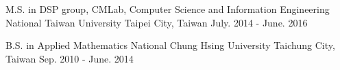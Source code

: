 

\begin{cventries}

  \cventry
    {M.S. in DSP group, CMLab, Computer Science and Information Engineering} %
    {National Taiwan University} %
    {Taipei City, Taiwan} %
    {July. 2014 - June. 2016} %
    {
      \begin{cvitems} %
      \end{cvitems}
    }

  \cventry
    {B.S. in Applied Mathematics} %
    {National Chung Hsing University} %
    {Taichung City, Taiwan} %
    {Sep. 2010 - June. 2014} %
    {
      \begin{cvitems} %
      \end{cvitems}
    }


\end{cventries}
